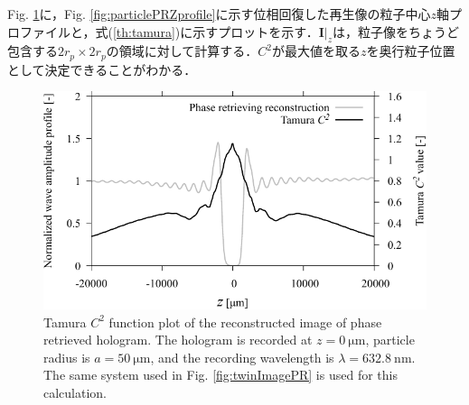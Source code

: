 Fig. \ref{fig:tamuratheory}に，Fig. \ref{fig:particlePRZprofile}に示す位相回復した再生像の粒子中心$z$軸プロファイルと，式(\ref{th:tamura})に示すプロットを示す．$\bm{I}|_z$は，粒子像をちょうど包含する$2r_p \times 2r_p$の領域に対して計算する．$C^2$が最大値を取る$z$を奥行粒子位置として決定できることがわかる．
\begin{figure}[H]
    \centering
    \includegraphics[width=0.8\linewidth]{./Figure/2_Theory/tamuraprof.pdf}
    \caption{Tamura $C^2$ function plot of the reconstructed image of phase retrieved hologram. The hologram is recorded at $z = \SI{0}{\um}$, particle radius is $a=\SI{50}{\um}$, and the recording wavelength is $\lambda = \SI{632.8}{\nm}$. The same system used in Fig. \ref{fig:twinImagePR} is used for this calculation.}
    \label{fig:tamuratheory}
\end{figure}


